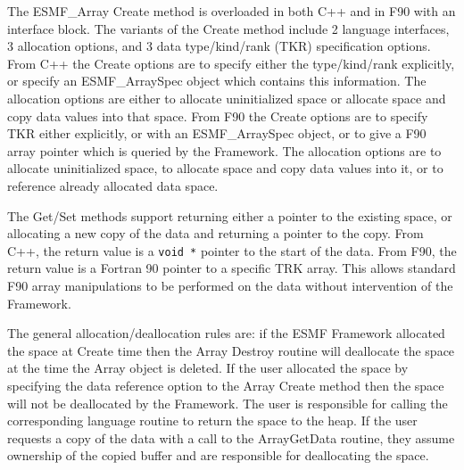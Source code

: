 

The ESMF\_Array Create method is overloaded in both C++ and in
F90 with an interface block.
The variants of the Create method include
2 language interfaces, 3 allocation options, and 3 data type/kind/rank
(TKR)
specification options.  From C++ the Create options are to specify
either the type/kind/rank explicitly, or specify an ESMF\_ArraySpec
object which contains this information.  The allocation options 
are either to allocate uninitialized space or allocate space and
copy data values into that space.  From F90 the Create options
are to specify TKR either explicitly, or with an ESMF\_ArraySpec
object, or to give a F90 array pointer which is queried by the
Framework.  The allocation options are to allocate uninitialized
space, to allocate space and copy data values into it, or to
reference already allocated data space.


The Get/Set methods support returning either a pointer to
the existing space, or allocating a new copy of the data
and returning a pointer to the copy.  From C++, the return 
value is a {\tt void *} pointer to the start of the data.
From F90, the return value is a Fortran 90 pointer to a
specific TRK array.  This allows standard F90 array manipulations
to be performed on the data without intervention of the Framework.

The general allocation/deallocation rules are: if the ESMF Framework
allocated the space at Create time then the Array Destroy routine 
will deallocate the space at the time the Array object is deleted.  
If the user allocated the space by specifying the data 
reference option to the Array Create method then  
the space will not
be deallocated by the Framework. The user is responsible
for calling the corresponding language routine to return the
space to the heap.  If the user requests a copy of the data with
a call to the ArrayGetData routine, they assume ownership of
the copied buffer and are responsible for deallocating the space.


